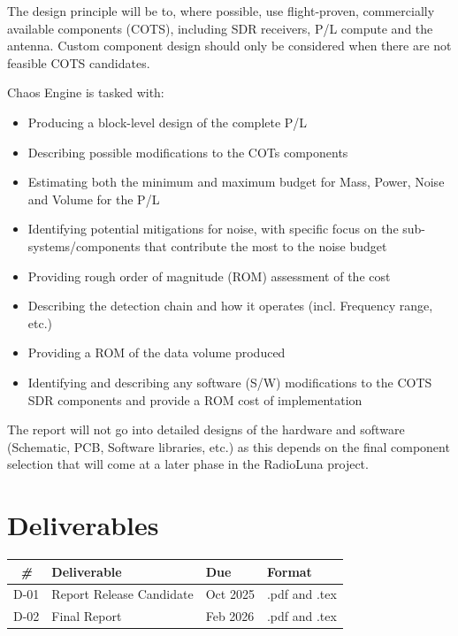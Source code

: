 \documentclass[
	a4paper, %
]{ChaosEngineReport}
\begin{document}
The design principle will be to, where possible, use flight-proven, commercially available components (COTS), including SDR receivers, P/L compute and the antenna. Custom component design should only be considered when there are not feasible COTS candidates.

Chaos Engine is tasked with:
\begin{itemize}
\item{Producing a block-level design of the complete P/L}
\item{Describing possible modifications to the COTs components}
\item{Estimating both the minimum and maximum budget for Mass, Power, Noise and Volume for the P/L}
\item{Identifying potential mitigations for noise, with specific focus on the sub-systems/components that contribute the most to the noise budget}
\item{Providing rough order of magnitude (ROM) assessment of the cost}
\item{Describing the detection chain and how it operates (incl. Frequency range, etc.)}
\item{Providing a ROM of the data volume produced}
\item{Identifying and describing any software (S/W) modifications to the COTS SDR components and provide a ROM cost of implementation}
\end{itemize}

The report will not go into detailed designs of the hardware and software (Schematic, PCB, Software libraries, etc.) as this depends on the final component selection that will come at a later phase in the RadioLuna project.


\section{Deliverables}

\begin{table}[H]
  \centering
  \begin{tabularx}{\textwidth}{clll}
    \toprule
    \textit{\#} & \textbf{Deliverable}  & \textbf{Due} & \textbf{Format} \\
    \toprule
    D-01 & Report Release Candidate & Oct 2025 & .pdf and .tex \\
    D-02 & Final Report & Feb 2026 & .pdf and .tex \\
  \end{tabularx}
\end{table}
\end{document}
